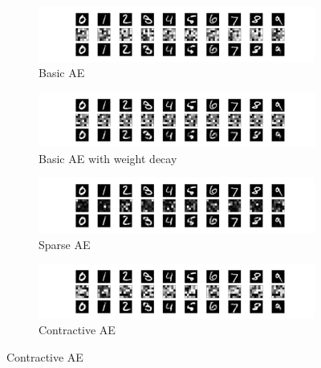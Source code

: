 \begin{figure}[htbp]
  \centering
  \begin{subfigure}{0.48\figwidth}
    \includegraphics[width=\textwidth,trim={14em 0 12em 0},clip]{basic-36-rmsprop-xent.pdf}
    \caption{\label{Fig.mnist.basic}Basic AE}
  \end{subfigure}
  \hfill
  \begin{subfigure}{0.48\figwidth}
    \includegraphics[width=\textwidth,trim={14em 0 12em 0},clip]{basic-wd-36-rmsprop-xent.pdf}
    \caption{\label{Fig.mnist.wd}Basic AE with weight decay}
  \end{subfigure}

  \begin{subfigure}{0.48\figwidth}
    \includegraphics[width=\textwidth,trim={14em 0 12em 0},clip]{sparse-36-rmsprop-xent.pdf}
    \caption{\label{Fig.mnist.sparse}Sparse AE}
  \end{subfigure}
  \hfill
  \begin{subfigure}{0.48\figwidth}
    \includegraphics[width=\textwidth,trim={14em 0 12em 0},clip]{contractive-36-rmsprop-xent.pdf}
    \caption{\label{Fig.mnist.contractive}Contractive AE}
  \end{subfigure}
  

\end{figure}
